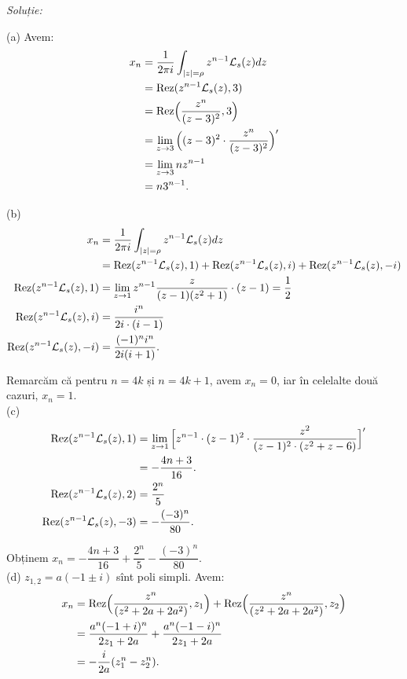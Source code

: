 \emph{Soluție:}

(a) Avem:
\begin{align*}
  x_n &= \dfrac{1}{2\pi i} \int_{|z| = \rho} z^{n-1} \mathcal{L}_s (z) dz \\
      &= \mathrm{Rez}(z^{n-1} \mathcal{L}_s(z), 3) \\
      &= \mathrm{Rez} \Big( \dfrac{z^n}{(z-3)^2}, 3 \Big) \\
      &= \lim_{z \to 3} \Big( (z-3)^2 \cdot \dfrac{z^n}{(z-3)^2} \Big)^{\prime} \\
      &= \lim_{z \to 3} nz^{n-1} \\
      &= n3^{n-1}.
\end{align*}

(b)
\begin{align*}
  x_n &= \dfrac{1}{2 \pi i} \int_{|z| = \rho} z^{n-1} \mathcal{L}_s(z) dz \\
      &= \mathrm{Rez}(z^{n-1} \mathcal{L}_s (z), 1) + \mathrm{Rez}(z^{n-1} \mathcal{L}_s(z), i) + 
        \mathrm{Rez}(z^{n-1} \mathcal{L}_s(z), -i) \\
  \mathrm{Rez}(z^{n-1}\mathcal{L}_s(z),1) &= \lim_{z \to 1} z^{n-1} \dfrac{z}{(z - 1)(z^2 + 1)} 
                             \cdot (z-1) = \dfrac{1}{2} \\
  \mathrm{Rez}(z^{n-1} \mathcal{L}_s(z), i) &= \dfrac{i^n}{2i \cdot (i-1)} \\
  \mathrm{Rez}(z^{n-1} \mathcal{L}_s(z), -i) &= \dfrac{(-1)^n i^n}{2i(i+1)}.
\end{align*}

Remarcăm că pentru $n = 4k$ și $n = 4k+1$, avem $x_n = 0$, iar în celelalte 
două cazuri, $x_n = 1$. \\

(c)
\begin{align*}
  \mathrm{Rez}(z^{n-1} \mathcal{L}_s(z), 1) &= \lim_{z\to 1} \Big[ z^{n-1} \cdot (z-1)^2 \cdot 
                               \dfrac{z^2}{(z-1)^2 \cdot (z^2 + z - 6)} \Big]^{\prime}\\
                             &= - \dfrac{4n + 3}{16}. \\
  \mathrm{Rez}(z^{n-1} \mathcal{L}_s(z), 2) &= \dfrac{2^n}{5} \\
  \mathrm{Rez}(z^{n-1} \mathcal{L}_s(z), -3) &= -\dfrac{(-3)^n}{80}.
\end{align*}

Obținem $x_n = - \dfrac{4n+3}{16} + \dfrac{2^n}{5} - \dfrac{(-3)^n}{80}$. \\

(d) $z_{1,2} = a (-1 \pm i)$ sînt poli simpli. Avem:
\begin{align*}
  x_n &= \mathrm{Rez}\Big( \dfrac{z^n}{(z^2 + 2a + 2a^2)}, z_1 \Big) + 
        \mathrm{Rez}\Big(  \dfrac{z^n}{(z^2 + 2a + 2a^2)}, z_2 \Big) \\
      &= \dfrac{a^n(-1 + i)^n}{2z_1 + 2a} + \dfrac{a^n(-1-i)^n}{2z_1 + 2a} \\
      &= -\dfrac{i}{2a}(z_1^n - z_2^n).
\end{align*}

